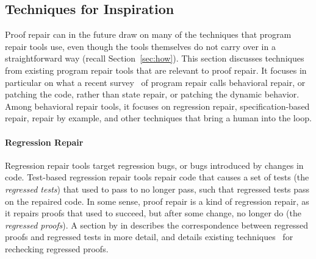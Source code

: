 \subsection{Techniques for Inspiration}
\label{sec:techniques}


Proof repair can in the future draw on many of the techniques that program repair tools use,
even though the tools themselves do not carry over in a straightforward way (recall Section~\ref{sec:how}).
This section discusses techniques from existing program repair tools that are relevant to proof repair.
It focuses in particular on what a recent survey~\cite{Monperrus:2018:ASR:3177787.3105906} of program repair calls behavioral repair,
or patching the code, rather than state repair, or patching the dynamic behavior.
Among behavioral repair tools, it focuses on regression repair, specification-based repair,
repair by example, and other techniques that bring a human into the loop.

\paragraph{Regression Repair}
Regression repair tools target regression bugs, or bugs introduced by changes in code.
Test-based regression repair tools repair code that causes a set of tests (the \textit{regressed tests}) that used to pass to no longer pass,
such that regressed tests pass on the repaired code.
In some sense, proof repair is a kind of regression repair, as it repairs
proofs that used to succeed, but after some change, no longer do (the \textit{regressed proofs}).
A section by  in  describes the correspondence between regressed proofs and regressed tests in more detail,
and details existing techniques~\cite{Palmskog2018, Wenzel2013MultiProcessing, Barras2013, Celik:2017:IRP:3155562.3155588, Wenzel2013, Barras2015, deMoura2015, Wenzel2014, WenzelScalingIsabelle, WenzelFurtherScalingIsabelle} for rechecking regressed proofs.

